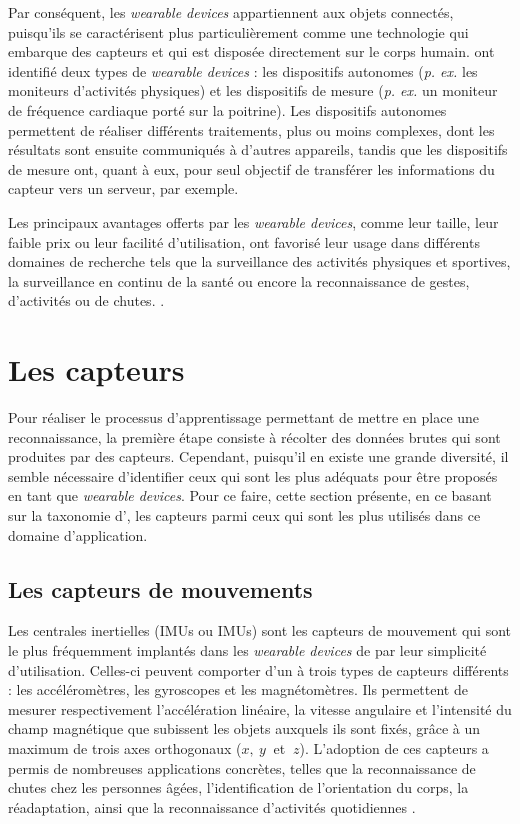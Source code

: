 Par conséquent, les \textit{wearable devices} appartiennent aux objets connectés, puisqu'ils se caractérisent plus particulièrement comme une technologie qui embarque des capteurs et qui est disposée directement sur le corps humain. \cite{Godfrey2018} ont identifié deux types de \textit{wearable devices} : les dispositifs autonomes (\textit{p. ex.} les moniteurs d'activités physiques) et les dispositifs de mesure (\textit{p. ex.} un moniteur de fréquence cardiaque porté sur la poitrine). Les dispositifs autonomes permettent de réaliser différents traitements, plus ou moins complexes, dont les résultats sont ensuite communiqués à d'autres appareils, tandis que les dispositifs de mesure ont, quant à eux, pour seul objectif de transférer les informations du capteur vers un serveur, par exemple.

Les principaux avantages offerts par les \textit{wearable devices}, comme leur taille, leur faible prix ou leur facilité d'utilisation, ont favorisé leur usage dans différents domaines de recherche tels que la surveillance des activités physiques et sportives, la surveillance en continu de la santé ou encore la reconnaissance de gestes, d'activités ou de chutes. \citep{Seon-WooLee2002, Istepanian2011, Garcia-Ceja2014, Bayat2014, YuanJieFan2014, Gao2014, Nielsen2014, Adib2015, Davis2016, Khan2016, Chapron2018}.

\section{Les capteurs}

Pour réaliser le processus d'apprentissage permettant de mettre en place une reconnaissance, la première étape consiste à récolter des données brutes qui sont produites par des capteurs. Cependant, puisqu'il en existe une grande diversité, il semble nécessaire d'identifier ceux qui sont les plus adéquats pour être proposés en tant que \textit{wearable devices}. Pour ce faire, cette section présente, en ce basant sur la taxonomie d'\cite{Acampora2013}, les capteurs parmi ceux qui sont les plus utilisés dans ce domaine d'application.

\subsection{Les capteurs de mouvements}

Les centrales inertielles (\aclp{IMU} ou \acsp{IMU}) sont les capteurs de mouvement qui sont le plus fréquemment implantés dans les \textit{wearable devices} de par leur simplicité d'utilisation. Celles-ci peuvent comporter d'un à trois types de capteurs différents : les accéléromètres, les gyroscopes et les magnétomètres. Ils permettent de mesurer respectivement l'accélération linéaire, la vitesse angulaire et l'intensité du champ magnétique que subissent les objets auxquels ils sont fixés, grâce à un maximum de trois axes orthogonaux ($x,\: y\: $ et $\: z$). L'adoption de ces capteurs a permis de nombreuses applications concrètes, telles que la reconnaissance de chutes chez les personnes âgées, l'identification de l'orientation du corps, la réadaptation, ainsi que la reconnaissance d'activités quotidiennes \citep{Seon-WooLee2002, Garcia-Ceja2014, Bayat2014, Gao2014, Davis2016, Chapron2018}.

